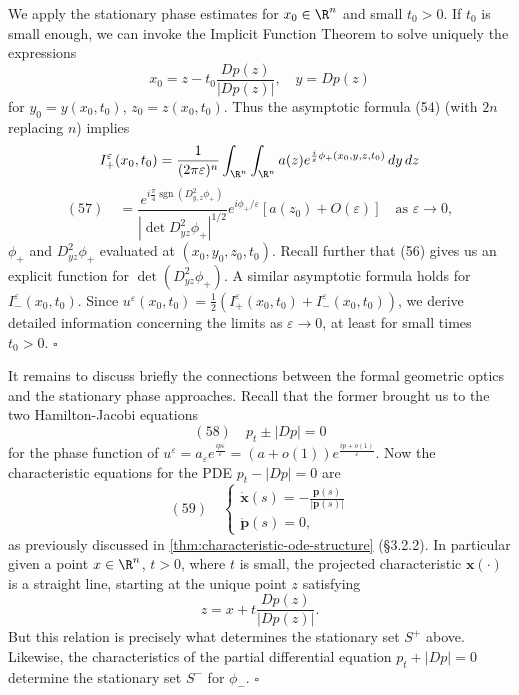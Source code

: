 \begin{example}
We apply the stationary phase estimates for $x_0\in\R^n$ and small $t_0>0$. If $t_0$ is small enough, we can invoke the Implicit Function Theorem to solve uniquely the expressions
$$x_0 = z - t_0\frac{Dp(z)}{|Dp(z)|}, \quad y=Dp(z)$$
for $y_0=y(x_0,t_0)$, $z_0=z(x_0,t_0)$. Thus the asymptotic formula (54) (with $2n$ replacing $n$) implies
$$I_+^\varepsilon(x_0,t_0) = \frac{1}{(2\pi\varepsilon)^n}\int_{\R^n}\int_{\R^n} a(z)e^{\frac{i}{\varepsilon}\phi_+(x_0,y,z,t_0)}\,dy\,dz$$
$$(57) \quad = \frac{e^{i\frac{\pi}{4}\operatorname{sgn}(D^2_{y,z}\phi_+)}}{|\det D^2_{yz}\phi_+|^{1/2}} e^{i\phi_+/\varepsilon}[a(z_0)+O(\varepsilon)] \quad \text{as } \varepsilon\to 0,$$
$\phi_+$ and $D^2_{yz}\phi_+$ evaluated at $(x_0,y_0,z_0,t_0)$. Recall further that (56) gives us an explicit function for $\det(D^2_{yz}\phi_+)$. A similar asymptotic formula holds for $I_-^\varepsilon(x_0,t_0)$. Since $u^\varepsilon(x_0,t_0)=\frac{1}{2}(I_+^\varepsilon(x_0,t_0)+I_-^\varepsilon(x_0,t_0))$, we derive detailed information concerning the limits as $\varepsilon\to0$, at least for small times $t_0>0$. $\square$
\end{example}

\begin{remark}
\label{rem:optics-stationary-phase-connection}
It remains to discuss briefly the connections between the formal geometric optics and the stationary phase approaches. Recall that the former brought us to the two Hamilton-Jacobi equations
$$(58) \quad p_t \pm |Dp| = 0$$
for the phase function of $u^\varepsilon = a_\varepsilon e^{\frac{ip\varepsilon}{\varepsilon}} = (a+o(1))e^{\frac{ip+o(1)}{\varepsilon}}$. Now the characteristic equations for the PDE $p_t-|Dp|=0$ are
$$(59) \quad \begin{cases} \dot{\mathbf{x}}(s) = -\frac{\mathbf{p}(s)}{|\mathbf{p}(s)|} \\ \dot{\mathbf{p}}(s) = 0, \end{cases}$$
as previously discussed in \cref{thm:characteristic-ode-structure} (\S3.2.2). In particular given a point $x\in\R^n$, $t>0$, where $t$ is small, the projected characteristic $\mathbf{x}(\cdot)$ is a straight line, starting at the unique point $z$ satisfying
$$z = x+t\frac{Dp(z)}{|Dp(z)|}.$$
But this relation is precisely what determines the stationary set $S^+$ above. Likewise, the characteristics of the partial differential equation $p_t+|Dp|=0$ determine the stationary set $S^-$ for $\phi_-$. $\square$
\end{remark}

